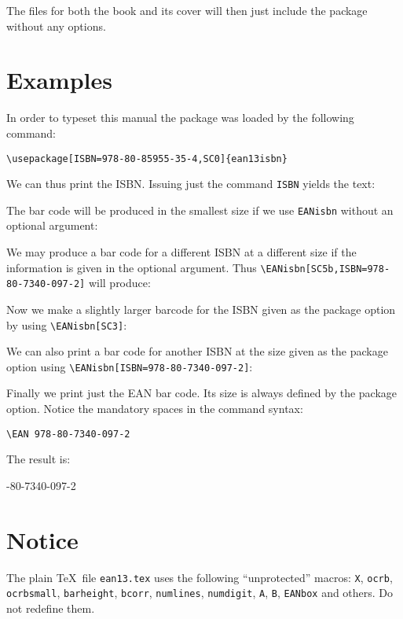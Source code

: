 \documentclass[11pt]{article}
\DeclareRobustCommand\cmd[1]{\texttt{\Bslash#1}}
\begin{document}
The files for both the book and its cover will then just include the package without any options.

\section{Examples}
In order to typeset this manual the package was loaded by the following command:

\medskip
\verb;\usepackage[ISBN=978-80-85955-35-4,SC0]{ean13isbn};

\medskip
We can thus print the ISBN. Issuing just the command \cmd{ISBN} yields the text:

\medskip
\centerline{\ISBN}

\medskip
The bar
code will be produced in the smallest size if we use \cmd{EANisbn} without an optional argument:

\medskip
\centerline{\EANisbn}

\medskip
We may produce a bar code for a different ISBN at a different size if the information is given in
the optional argument. Thus \verb;\EANisbn[SC5b,ISBN=978-80-7340-097-2]; will produce:

\medskip
\centerline{\EANisbn[SC5b,ISBN=978-80-7340-097-2]}

\medskip
Now we make a slightly larger barcode for the ISBN given as the package option by using
\verb;\EANisbn[SC3];:

\medskip
\centerline{\EANisbn[SC3]}

\medskip
We can also print a bar code for another ISBN at the size given as the package option using
\verb;\EANisbn[ISBN=978-80-7340-097-2];:

\medskip
\centerline{\EANisbn[ISBN=978-80-7340-097-2]}

\medskip
Finally we print just the EAN bar code. Its size is always defined by the package option. Notice
the mandatory spaces in the command syntax:

\medskip
\verb*;\EAN 978-80-7340-097-2 ;

The result is:

\medskip
\centerline{-80-7340-097-2 }

\section{Notice}
The plain \TeX\ file \texttt{ean13.tex} uses the following ``unprotected'' macros: \cmd{X},
\cmd{ocrb}, \cmd{ocrbsmall}, \cmd{barheight}, \cmd{bcorr}, \cmd{numlines}, \cmd{numdigit},
\cmd{A}, \cmd{B}, \cmd{EANbox} and others. Do not redefine them.
\end{document}
